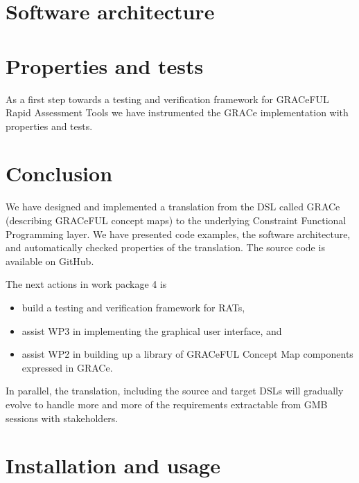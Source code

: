\documentclass{article}
\begin{document}


\section{Software architecture}
\label{sec:architecture}




\section{Properties and tests}

As a first step towards a testing and verification framework for
GRACeFUL Rapid Assessment Tools we have instrumented the GRACe
implementation with properties and tests.
%


\section{Conclusion}
\label{sec:conclusion}

We have designed and implemented a translation from the DSL called
GRACe (describing GRACeFUL concept maps) to the underlying Constraint
Functional Programming layer.
%
We have presented code examples, the software architecture, and
automatically checked properties of the translation.
%
The source code is available on GitHub.

The next actions in work package 4 is
\begin{itemize}
\item build a testing and verification framework for RATs,
\item assist WP3 in implementing the graphical user interface, and
\item assist WP2 in building up a library of GRACeFUL Concept Map
  components expressed in GRACe.
\end{itemize}
%
In parallel, the translation, including the source and target DSLs
will gradually evolve to handle more and more of the requirements
extractable from GMB sessions with stakeholders.


\appendix
\section{Installation and usage}





\end{document}
